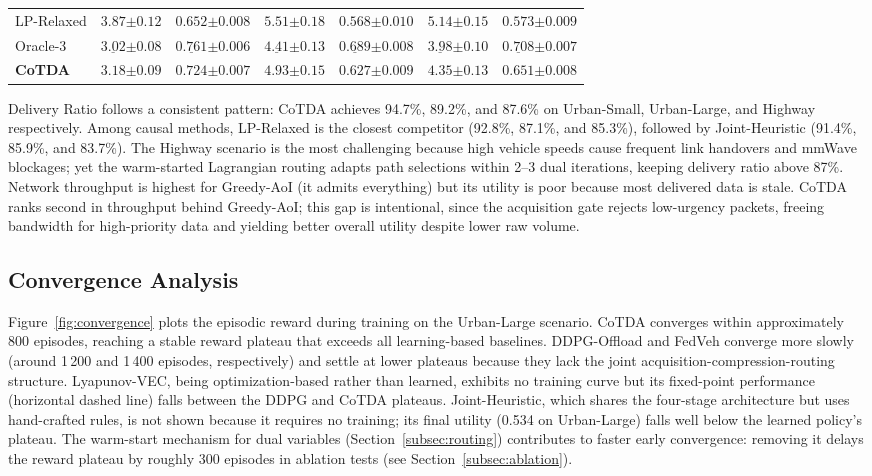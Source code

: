 \documentclass[final,3p,times,review,sort&compress]{elsarticle}
\begin{document}
\begin{table}[t!]
\begin{tabularx}{\textwidth}{l *{6}{X}}
LP-Relaxed & $3.87{\scriptstyle\pm0.12}$ & $0.652{\scriptstyle\pm0.008}$ & $5.51{\scriptstyle\pm0.18}$ & $0.568{\scriptstyle\pm0.010}$ & $5.14{\scriptstyle\pm0.15}$ & $0.573{\scriptstyle\pm0.009}$ \\
Oracle-3 & $\underline{3.02}{\scriptstyle\pm0.08}$ & $\underline{0.761}{\scriptstyle\pm0.006}$ & $\underline{4.41}{\scriptstyle\pm0.13}$ & $\underline{0.689}{\scriptstyle\pm0.008}$ & $\underline{3.98}{\scriptstyle\pm0.10}$ & $\underline{0.708}{\scriptstyle\pm0.007}$ \\
\midrule
\textbf{CoTDA} & $\mathbf{3.18}{\scriptstyle\pm0.09}$ & $\mathbf{0.724}{\scriptstyle\pm0.007}$ & $\mathbf{4.93}{\scriptstyle\pm0.15}$ & $\mathbf{0.627}{\scriptstyle\pm0.009}$ & $\mathbf{4.35}{\scriptstyle\pm0.13}$ & $\mathbf{0.651}{\scriptstyle\pm0.008}$ \\
\bottomrule
\end{tabularx}
\end{table}

Delivery Ratio follows a consistent pattern: CoTDA achieves 94.7\%, 89.2\%, and 87.6\% on Urban-Small, Urban-Large, and Highway respectively. Among causal methods, LP-Relaxed is the closest competitor (92.8\%, 87.1\%, and 85.3\%), followed by Joint-Heuristic (91.4\%, 85.9\%, and 83.7\%). The Highway scenario is the most challenging because high vehicle speeds cause frequent link handovers and mmWave blockages; yet the warm-started Lagrangian routing adapts path selections within 2--3 dual iterations, keeping delivery ratio above 87\%. Network throughput is highest for Greedy-AoI (it admits everything) but its utility is poor because most delivered data is stale. CoTDA ranks second in throughput behind Greedy-AoI; this gap is intentional, since the acquisition gate rejects low-urgency packets, freeing bandwidth for high-priority data and yielding better overall utility despite lower raw volume.

\subsection{Convergence Analysis}
\label{subsec:convergence}

Figure~\ref{fig:convergence} plots the episodic reward during training on the Urban-Large scenario. CoTDA converges within approximately 800 episodes, reaching a stable reward plateau that exceeds all learning-based baselines. DDPG-Offload and FedVeh converge more slowly (around 1\,200 and 1\,400 episodes, respectively) and settle at lower plateaus because they lack the joint acquisition-compression-routing structure. Lyapunov-VEC, being optimization-based rather than learned, exhibits no training curve but its fixed-point performance (horizontal dashed line) falls between the DDPG and CoTDA plateaus. Joint-Heuristic, which shares the four-stage architecture but uses hand-crafted rules, is not shown because it requires no training; its final utility (0.534 on Urban-Large) falls well below the learned policy's plateau. The warm-start mechanism for dual variables (Section~\ref{subsec:routing}) contributes to faster early convergence: removing it delays the reward plateau by roughly 300 episodes in ablation tests (see Section~\ref{subsec:ablation}).
\end{document}
